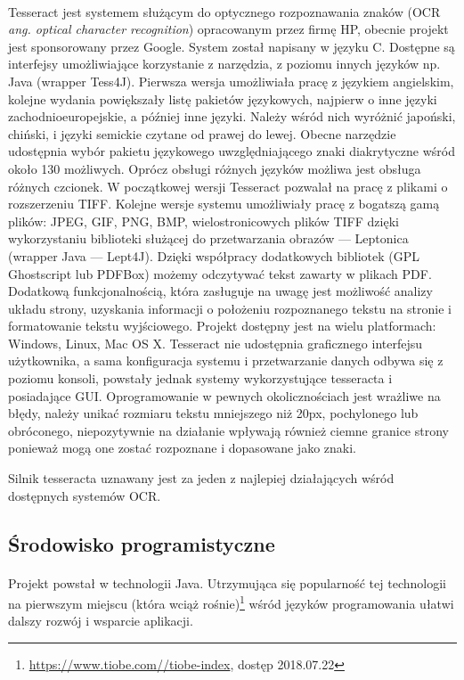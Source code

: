 \documentclass[a4paper,12pt]{article}
\begin{document}
	    \paragraph{\indent} Tesseract jest systemem służącym do optycznego rozpoznawania znaków (OCR \textit{ang. optical character recognition}) 
			opracowanym przez firmę HP, obecnie projekt jest sponsorowany przez Google. System został napisany w języku C. 
			Dostępne są interfejsy umożliwiające korzystanie z narzędzia, z poziomu innych języków np. Java (wrapper Tess4J). 
			Pierwsza wersja umożliwiała pracę z językiem angielskim, kolejne wydania powiększały listę pakietów językowych, 
			najpierw o inne języki zachodnioeuropejskie, a później inne języki. Należy wśród nich wyróżnić japoński, chiński, 
			i języki semickie czytane od prawej do lewej. Obecne narzędzie udostępnia wybór pakietu językowego uwzględniającego 
			znaki diakrytyczne wśród około 130 możliwych. Oprócz obsługi różnych języków możliwa jest obsługa różnych czcionek. 
			W początkowej wersji Tesseract pozwalał na pracę z plikami o rozszerzeniu TIFF. Kolejne wersje systemu umożliwiały pracę z bogatszą gamą plików: 
			JPEG, GIF, PNG, BMP, wielostronicowych plików TIFF dzięki wykorzystaniu biblioteki służącej do przetwarzania obrazów --- Leptonica 
			(wrapper Java --- Lept4J). Dzięki współpracy dodatkowych bibliotek (GPL Ghostscript lub PDFBox) możemy odczytywać tekst zawarty w plikach PDF. 
			Dodatkową funkcjonalnością, która zasługuje na uwagę jest możliwość analizy układu strony, uzyskania informacji o położeniu rozpoznanego tekstu na stronie 
			i formatowanie tekstu wyjściowego. Projekt dostępny jest na wielu platformach: Windows, Linux, Mac OS X. Tesseract nie udostępnia graficznego interfejsu użytkownika, 
			a sama konfiguracja systemu i przetwarzanie danych odbywa się z poziomu konsoli, powstały jednak systemy wykorzystujące tesseracta i posiadające GUI. 
			Oprogramowanie w pewnych okolicznościach jest wrażliwe na błędy, należy unikać rozmiaru tekstu mniejszego niż 20px, pochylonego lub obróconego, 
			niepozytywnie na działanie wpływają również ciemne granice strony ponieważ mogą one zostać rozpoznane i dopasowane jako znaki.
	    \par Silnik tesseracta uznawany jest za jeden z najlepiej działających wśród dostępnych systemów OCR. 

	\subsection{Środowisko programistyczne}
		\paragraph{\indent} Projekt powstał w technologii Java. Utrzymująca się popularność tej technologii na pierwszym miejscu 
			(która wciąż rośnie)\footnote{\href{https://www.tiobe.com//tiobe-index}{\url{https://www.tiobe.com//tiobe-index}}, dostęp 2018.07.22} 
			wśród języków programowania ułatwi dalszy rozwój i wsparcie aplikacji. 
		
\end{document}
